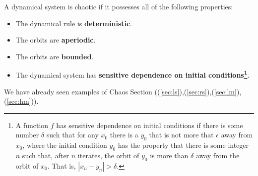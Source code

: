 A dynamical system is chaotic if it possesses all of the following properties:
\begin{itemize}
	\item The dynamical rule is \textbf{deterministic}.
	\item The orbits are \textbf{aperiodic}.
	\item The orbits are \textbf{bounded}.
	\item The dynamical system has \textbf{sensitive dependence on initial conditions\footnote{A function $f$ has sensitive dependence on initial conditions if there is some number $\delta$ such that for any $x_0$ there is a $y_0$ that is not more that $\epsilon$ away from $x_0$, where the initial condition $y_0$ has the property that there is some integer $n$ such that, after $n$ iterates, the orbit of $y_0$ is more than $\delta$ away from the orbit of $x_0$. That is, $|x_n-y_n|>\delta$.}}.
\end{itemize}
We have already seen examples of Chaos Section ((\ref{sec:ls}),(\ref{sec:rs}),(\ref{sec:lm}),(\ref{sec:hm})).